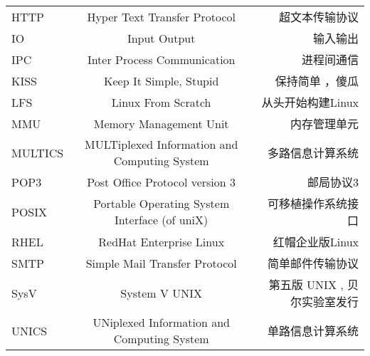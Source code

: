 \begin{landscape}
\begin{center}
\begin{supertabular}{l|c|r}
HTTP & Hyper Text Transfer Protocol & 超文本传输协议 \\
IO & Input Output & 输入输出 \\
IPC & Inter Process Communication & 进程间通信 \\
KISS & Keep It Simple, Stupid& 保持简单 ，傻瓜 \\

LFS & Linux From Scratch & 从头开始构建Linux \\
MMU & Memory Management Unit & 内存管理单元 \\

MULTICS & MULTiplexed Information and Computing System & 多路信息计算系统 \\

POP3 & Post Office Protocol version 3 & 邮局协议3\\
POSIX & Portable Operating System Interface (of uniX) & 可移植操作系统接口 \\

RHEL & RedHat Enterprise Linux & 红帽企业版Linux\\
SMTP & Simple Mail Transfer Protocol & 简单邮件传输协议 \\


SysV & System V UNIX & 第五版 UNIX , 贝尔实验室发行 \\

UNICS & UNiplexed Information and Computing System & 单路信息计算系统\\
\end{supertabular}
\end{center}
\end{landscape}